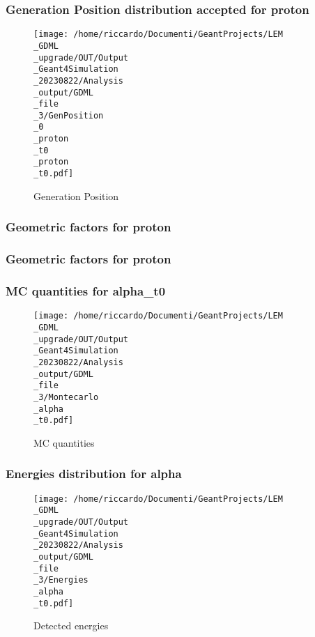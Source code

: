 \documentclass[8pt]{beamer}
\begin{document}
            \begin{frame}
                \frametitle{Generation Position distribution accepted for proton}
            
        \begin{figure}[h]
            \centering
            \texttt{[image: /home/riccardo/Documenti/GeantProjects/LEM\\\_GDML\\\_upgrade/OUT/Output\\\_Geant4Simulation\\\_20230822/Analysis\\\_output/GDML\\\_file\\\_3/GenPosition\\\_0\\\_proton\\\_t0\\\_proton\\\_t0.pdf]}
            \caption{Generation Position}
        \end{figure}
        
            \end{frame}
            
            \begin{frame}
                \frametitle{Geometric factors for proton}
            
            \end{frame}
            
            \begin{frame}
                \frametitle{Geometric factors for proton}
            
            \end{frame}
            
            \begin{frame}
                \frametitle{MC quantities for alpha\_t0}
            
        \begin{figure}[h]
            \centering
            \texttt{[image: /home/riccardo/Documenti/GeantProjects/LEM\\\_GDML\\\_upgrade/OUT/Output\\\_Geant4Simulation\\\_20230822/Analysis\\\_output/GDML\\\_file\\\_3/Montecarlo\\\_alpha\\\_t0.pdf]}
            \caption{MC quantities}
        \end{figure}
        
            \end{frame}
            
            \begin{frame}
                \frametitle{Energies distribution for alpha}
            
        \begin{figure}[h]
            \centering
            \texttt{[image: /home/riccardo/Documenti/GeantProjects/LEM\\\_GDML\\\_upgrade/OUT/Output\\\_Geant4Simulation\\\_20230822/Analysis\\\_output/GDML\\\_file\\\_3/Energies\\\_alpha\\\_t0.pdf]}
            \caption{Detected energies}
        \end{figure}
        
            \end{frame}
            
\end{document}
